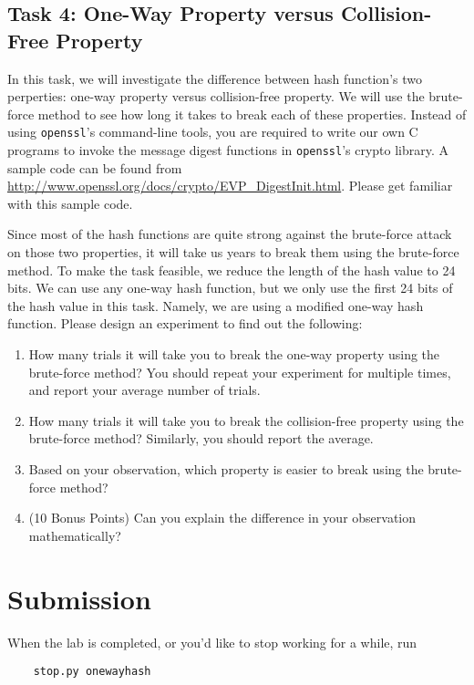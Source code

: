 \subsection{Task 4: One-Way Property versus Collision-Free Property}


In this task, we will investigate the difference between 
hash function's two perperties: one-way property versus collision-free property. 
We will use the brute-force method to see how long it takes to break
each of these properties. Instead of using {\tt openssl}'s command-line tools, 
you are required to write our own C programs to invoke the 
message digest functions in {\tt openssl}'s crypto library. 
A sample code can be found from 
\url{http://www.openssl.org/docs/crypto/EVP_DigestInit.html}. Please 
get familiar with this sample code.

Since most of the hash functions are quite strong against the brute-force
attack on those two properties, it will take us years to break them
using the brute-force method. To make the task feasible, we reduce 
the length of the hash value to 24 bits. We can use any one-way
hash function, but we only use the first 24 bits of the hash value
in this task. Namely, we are using a modified one-way hash function.
Please design an experiment to find out the following:

\begin{enumerate}
\item How many trials it will take you to break the one-way
property using the brute-force method? You should repeat your 
experiment for multiple times, and report your average number 
of trials.
\item How many trials it will take you to break the collision-free
property using the brute-force method? Similarly, you should 
report the average.
\item Based on your observation, which property is easier to 
break using the brute-force method?
\item (10 Bonus Points) Can you explain the difference in your 
observation mathematically?
\end{enumerate}

 

\section{Submission}
When the lab is completed, or you'd like to stop working for a while, run
\begin{verbatim}
    stop.py onewayhash
\end{verbatim}

